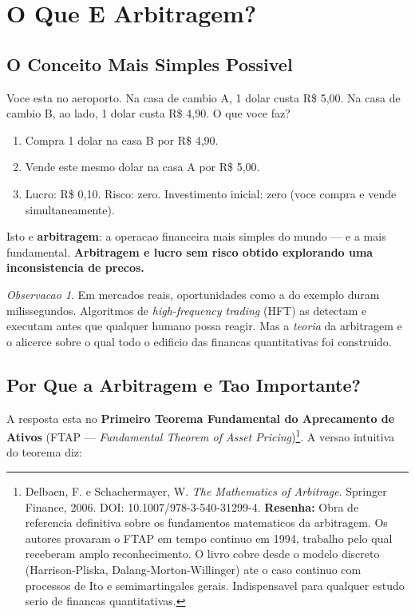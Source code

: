 \documentclass[12pt,a4paper]{article}
\theoremstyle{remark}
\newtheorem{obs}{Observacao}[section]
\begin{document}
\newpage
\tableofcontents
\newpage

\section{O Que E Arbitragem?}

\subsection{O Conceito Mais Simples Possivel}

Voce esta no aeroporto. Na casa de cambio A, 1 dolar custa R\$ 5,00.
Na casa de cambio B, ao lado, 1 dolar custa R\$ 4,90. O que voce faz?

\begin{enumerate}[nosep]
  \item Compra 1 dolar na casa B por R\$ 4,90.
  \item Vende este mesmo dolar na casa A por R\$ 5,00.
  \item Lucro: R\$ 0,10. Risco: zero. Investimento inicial: zero (voce compra e
        vende simultaneamente).
\end{enumerate}

Isto e \textbf{arbitragem}: a operacao financeira mais simples do mundo — e a mais
fundamental. \textbf{Arbitragem e lucro sem risco obtido explorando uma
inconsistencia de precos.}

\begin{obs}
Em mercados reais, oportunidades como a do exemplo duram milissegundos. Algoritmos
de \textit{high-frequency trading} (HFT) as detectam e executam antes que qualquer
humano possa reagir. Mas a \textit{teoria} da arbitragem e o alicerce sobre o qual
todo o edificio das financas quantitativas foi construido.
\end{obs}

\subsection{Por Que a Arbitragem e Tao Importante?}

A resposta esta no \textbf{Primeiro Teorema Fundamental do Aprecamento de Ativos}
(FTAP — \textit{Fundamental Theorem of Asset Pricing})\footnote{Delbaen, F. e
Schachermayer, W. \textit{The Mathematics of Arbitrage}. Springer Finance,
2006. DOI: 10.1007/978-3-540-31299-4. \textbf{Resenha:} Obra de referencia definitiva sobre
os fundamentos matematicos da arbitragem. Os autores provaram o FTAP em tempo
continuo em 1994, trabalho pelo qual receberam amplo reconhecimento. O livro
cobre desde o modelo discreto (Harrison-Pliska, Dalang-Morton-Willinger) ate o
caso continuo com processos de Ito e semimartingales gerais. Indispensavel para
qualquer estudo serio de financas quantitativas.}. A versao intuitiva do teorema
diz:
\end{document}
